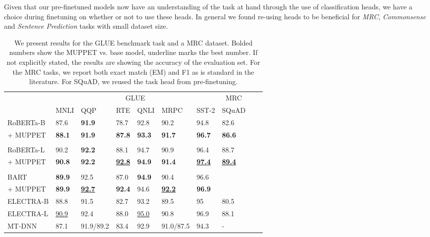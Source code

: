 \documentclass[11pt,a4paper]{article}
\begin{document}
Given that our pre-finetuned models now have an understanding of the task at hand through the use of classification heads, we have a choice during finetuning on whether or not to use these heads. In general we found re-using heads to be beneficial for \textit{MRC}, \textit{Commonsense} and \textit{Sentence Prediction} tasks with small dataset size.
\begin{table*}[th]
\centering
\small
\begin{tabular}{@{}llllllllll@{}}
\toprule
 & \multicolumn{6}{c}{GLUE} & \multicolumn{1}{c}{MRC} \\
 \cmidrule(lr){2-7}\cmidrule(lr){8-9} 
 & 
  MNLI &
  QQP &
  RTE &
  QNLI &
  MRPC &
  SST-2 &
  SQuAD &\\ \midrule
RoBERTa-B   & 87.6    & \textbf{91.9}    & 78.7 & 92.8 & 90.2   &94.8 & 82.6   \\
\quad\quad + MUPPET       & \textbf{88.1}         &  \textbf{91.9}         &  \textbf{87.8}   &     \textbf{93.3}  &   \textbf{91.7}      &  \textbf{96.7}    &  \textbf{86.6}    \\ \\ 
RoBERTa-L & 90.2   & \textbf{92.2}    & 88.1    &  94.7    & 90.9   &   96.4    & 88.7     \\
\quad\quad  + MUPPET        & \textbf{90.8}  &   \textbf{92.2}       &  \textbf{\underline{92.8}}    &   \textbf{94.9}   & \textbf{91.4}      &   \textbf{\underline{97.4}} &  \textbf{\underline{89.4}} \\ \\
BART   &  \textbf{89.9}    & 92.5   & 87.0 & \textbf{94.9} & 90.4 & 96.6 &    \\
\quad\quad  + MUPPET       &    \textbf{89.9}       &   \textbf{\underline{92.7}}       &  \textbf{92.4}  &  94.6     &   \textbf{\underline{92.2}}      & \textbf{96.9}     &     \\
\midrule
ELECTRA-B & 88.8 & 91.5 & 82.7 & 93.2 & 89.5 & 95 & 80.5 \\  
ELECTRA-L  & \underline{90.9} & 92.4 & 88.0 & \underline{95.0} & 90.8 & 96.9 & 88.1 \\ 
MT-DNN & 87.1 & 91.9/89.2 & 83.4 & 92.9 & 91.0/87.5 & 94.3 &- \\ \bottomrule
\end{tabular}
\caption{We present results for the GLUE benchmark task and a MRC dataset. Bolded numbers show the MUPPET vs. base model, underline marks the best number. If not explicitly stated, the results are showing the accuracy of the evaluation set. For the MRC tasks, we report both exact match (EM) and F1 as is standard in the literature. For SQuAD, we reused the task head from pre-finetuning.}
\label{table:mtl_glue_mrc}

\end{table*}
\end{document}
